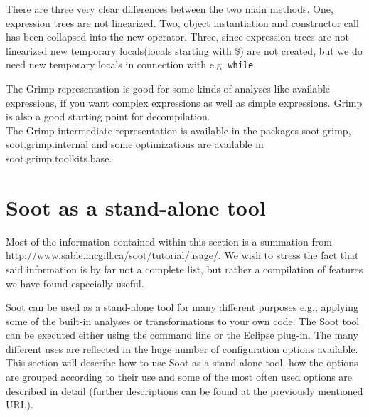 \documentclass{article}
\newcommand{\code}[1]{\texttt{\small #1}}
\begin{document}
There are three very clear differences between the two \textsf{main}
methods. One, expression trees are not linearized. Two, object
instantiation and constructor call has been collapsed into the
\textsf{new} operator. Three, since expression trees are not
linearized new temporary locals(locals starting with \textsf{\$}) are
not created, but we do need new temporary locals in connection with
e.g. \code{while}.

The Grimp representation is good for some kinds of analyses like
available expressions, if you want complex expressions as well as
simple expressions. Grimp is also a good starting point for
decompilation.\\

The Grimp intermediate representation is available in the packages
soot.grimp, soot.grimp.internal and some optimizations are available
in soot.grimp.\-toolkits.\-base.



\section{Soot as a stand-alone tool}
\label{section:soottool}



Most of the information contained within this section is a summation
from \url{http://www.sable.mcgill.ca/soot/tutorial/usage/}. We wish to
stress the fact that said information is by far not a complete list,
but rather a compilation of features we have found especially
useful.\bigskip

Soot can be used as a stand-alone tool for many different purposes
e.g., applying some of the built-in analyses or transformations to
your own code. The Soot tool can be executed either using the command
line or the Eclipse plug-in. The many different uses are reflected in
the huge number of configuration options available. This section will
describe how to use Soot as a stand-alone tool, how the options are
grouped according to their use and some of the most often used options
are described in detail (further descriptions can be found at the
previously mentioned URL).
\end{document}
